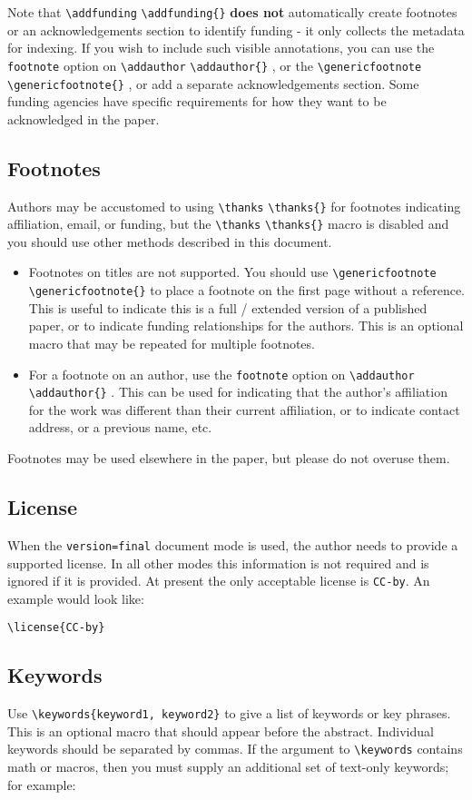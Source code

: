 \documentclass{iacrcc}
\newcommand{\cmd}[2][]{%
  \def\FirstArg{#1}
  \ifx\FirstArg\empty
    \texttt{\textbackslash{}#2}%
  \else
    \texttt{\textbackslash{}#2\{#1\}}%
  \fi
}
\begin{document}
Note that \cmd{addfunding} \textbf{does not} automatically create footnotes or
an acknowledgements section to identify funding - it only collects the
metadata for indexing. If you wish to include such visible
annotations, you can use the \texttt{footnote} option on
\cmd{addauthor}, or the \cmd{genericfootnote}, or add a separate
acknowledgements section. Some funding agencies have specific
requirements for how they want to be acknowledged in the paper.

\subsection{Footnotes}\label{footnotes}
Authors may be accustomed to using \cmd{thanks} for footnotes
indicating affiliation, email, or funding, but the
\cmd{thanks} macro is disabled and you should use other methods described
in this document.
\begin{itemize}
\item Footnotes on titles are not supported. You should use 
  \cmd{genericfootnote} to place a
  footnote on the first page without a reference. This is useful to
  indicate this is a full / extended version of a published paper, or to
  indicate funding relationships for the authors.  This is an optional
  macro that may be repeated for multiple footnotes.
\item For a footnote on an author, use the \texttt{footnote} option
  on \cmd{addauthor}. This can be used for indicating that the author's
  affiliation for the work was different than their current affiliation,
  or to indicate contact address, or a previous name, etc.
\end{itemize}

Footnotes may be used elsewhere in the paper, but please do not
overuse them.

\subsection{License}
When the \texttt{version=final} document mode is used, the author needs
to provide a supported license.  In all other modes this information
is not required and is ignored if it is provided.  At present the only
acceptable license is \texttt{CC-by}.  An example would look like:

\begin{verbatim}
\license{CC-by}
\end{verbatim}

\subsection{Keywords}
Use \texttt{\textbackslash keywords\{keyword1, keyword2\}} to give a
list of keywords or key phrases. This is an optional macro that should
appear before the abstract.  Individual keywords should be separated
by commas. If the argument to \texttt{\textbackslash keywords}
contains math or macros, then you must supply an additional set of
text-only keywords; for example:
\end{document}
